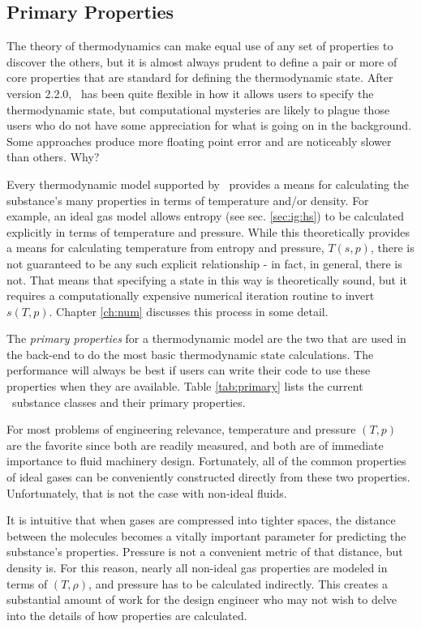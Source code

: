 \subsection{Primary Properties}\label{sec:intro:primary}

The theory of thermodynamics can make equal use of any set of properties to discover the others, but it is almost always prudent to define a pair or more of core properties that are standard for defining the thermodynamic state.  After version 2.2.0, \PM\ has been quite flexible in how it allows users to specify the thermodynamic state, but computational mysteries are likely to plague those users who do not have some appreciation for what is going on in the background.  Some approaches produce more floating point error and are noticeably slower than others.  Why?

Every thermodynamic model supported by \PM\ provides a means for calculating the substance's many properties in terms of temperature and/or density.  For example, an ideal gas model allows entropy (see sec. \ref{sec:ig:hs}) to be calculated explicitly in terms of temperature and pressure.  While this theoretically provides a means for calculating temperature from entropy and pressure, $T(s,p)$, there is not guaranteed to be any such explicit relationship - in fact, in general, there is not.  That means that specifying a state in this way is theoretically sound, but it requires a computationally expensive numerical iteration routine to invert $s(T,p)$.  Chapter \ref{ch:num} discusses this process in some detail.

The \emph{primary properties} for a thermodynamic model are the two that are used in the back-end to do the most basic thermodynamic state calculations.  The performance will always be best if users can write their code to use these properties when they are available.  Table \ref{tab:primary} lists the current \PM\ substance classes and their primary properties.

For most problems of engineering relevance, temperature and pressure $(T,p)$ are the favorite since both are readily measured, and both are of immediate importance to fluid machinery design.  Fortunately, all of the common properties of ideal gases can be conveniently constructed directly from these two properties.  Unfortunately, that is not the case with non-ideal fluids.

It is intuitive that when gases are compressed into tighter spaces, the distance between the molecules becomes a vitally important parameter for predicting the substance's properties.  Pressure is not a convenient metric of that distance, but density is.  For this reason, nearly all non-ideal gas properties are modeled in terms of $(T,\rho)$, and pressure has to be calculated indirectly.  This creates a substantial amount of work for the design engineer who may not wish to delve into the details of how properties are calculated.

